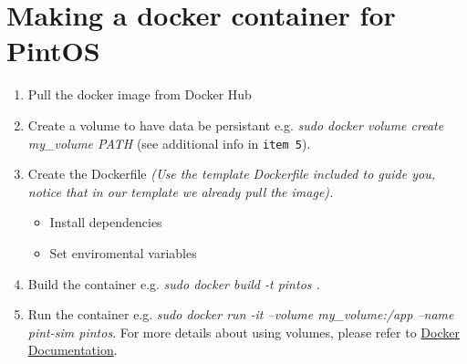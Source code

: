 \documentclass[12pt]{article}
\begin{document}
\maketitle

\section{Making a docker container for PintOS}

\begin{enumerate}
	\item Pull the docker image from Docker Hub
	\item Create a volume to have data be persistant e.g. \textit{sudo docker volume create my\_volume PATH} (see additional info in \texttt{item 5}).
	\item Create the Dockerfile \textit{(Use the template Dockerfile included to guide you, notice that in our template we already pull the image).}
	\begin{itemize}
		\item Install dependencies 
		\item Set enviromental variables 
	\end{itemize}
	\item Build the container e.g. \textit{sudo docker build -t pintos .}
	\item Run the container e.g. \textit{sudo docker run -it --volume my\_volume:/app --name pint-sim pintos}. For more details about using volumes, please refer to \href{https://docs.docker.com/storage/volumes/}{Docker Documentation}.
	
\end{enumerate}
\end{document}

